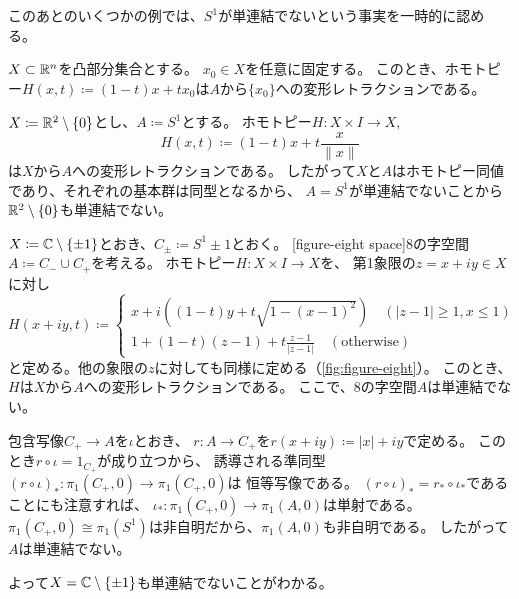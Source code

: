\documentclass[report]{jlreq}
\begin{document}
このあとのいくつかの例では、$S^1$が単連結でないという事実を一時的に認める。

\begin{example}[$\R^n$と凸部分集合]
    $X \subset \mathbb{R}^n$を凸部分集合とする。
    $x_0 \in X$を任意に固定する。
    このとき、ホモトピー$H(x, t) \coloneqq (1 - t) x + t x_0$は$A$から$\{x_0\}$への変形レトラクションである。
\end{example}

\begin{example}[$\R^2 \setminus \{0\}$と$S^1$]
    $X \coloneqq \mathbb{R}^2 \setminus \{0\}$とし、$A \coloneqq S^1$とする。
    ホモトピー$H \colon X \times I \to X,$
    \begin{equation}
        H(x, t) \coloneqq (1 - t) x + t \frac{x}{\|x\|}
    \end{equation}
    は$X$から$A$への変形レトラクションである。
    したがって$X$と$A$はホモトピー同値であり、それぞれの基本群は同型となるから、
    $A = S^1$が単連結でないことから$\R^2 \setminus \{0\}$も単連結でない。
\end{example}

\begin{example}[$\C$から2点を除いた空間]
    $X \coloneqq \mathbb{C} \setminus \{ \pm 1 \}$とおき、$C_\pm \coloneqq S^1 \pm 1$とおく。
    [figure-eight space]{8の字空間} $A \coloneqq C_- \cup C_+$を考える。
    ホモトピー$H \colon X \times I \to X$を、
    第1象限の$z = x + iy \in X$に対し
    \begin{equation}
        H(x + iy, t) \coloneqq \begin{cases}
            x + i \left( (1-t) y + t \sqrt{1 - (x - 1)^2}\right) \quad (|z - 1| \ge 1, x \le 1) \\
            1 + (1-t)(z - 1) + t \frac{z - 1}{|z - 1|} \quad (\text{otherwise})
        \end{cases}
    \end{equation}
    と定める。他の象限の$z$に対しても同様に定める（\cref{fig:figure-eight}）。
    このとき、$H$は$X$から$A$への変形レトラクションである。
    ここで、8の字空間$A$は単連結でない。
    \begin{innerproof}
        包含写像$C_+ \to A$を$\iota$とおき、
        $r \colon A \to C_+$を$r(x + iy) \coloneqq |x| + iy$で定める。
        このとき$r \circ \iota = 1_{C_+}$が成り立つから、
        誘導される準同型$(r \circ \iota)_* \colon \pi_1(C_+, 0) \to \pi_1(C_+, 0)$は
        恒等写像である。
        $(r \circ \iota)_* = r_* \circ \iota_*$であることにも注意すれば、
        $\iota_* \colon \pi_1(C_+, 0) \to \pi_1(A, 0)$は単射である。
        $\pi_1(C_+, 0) \cong \pi_1(S^1)$は非自明だから、$\pi_1(A, 0)$も非自明である。
        したがって$A$は単連結でない。
    \end{innerproof}
    よって$X = \mathbb{C} \setminus \{ \pm 1 \}$も単連結でないことがわかる。
\end{example}
\end{document}
